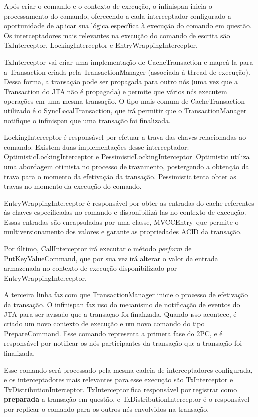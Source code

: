 \documentclass[11pt,twoside,a4paper]{book}
\begin{document}
Após criar o comando e o contexto de execução, o infinispan inicia o processamento do comando, oferecendo a cada interceptador configurado a oportunidade de aplicar sua lógica específica à execução do comando em questão. Os interceptadores mais relevantes na execução do comando de escrita são TxInterceptor, LockingInterceptor e EntryWrappingInterceptor.

TxInterceptor vai criar uma implementação de CacheTransaction e mapeá-la para a Transaction criada pela TransactionManager (associada à thread de execução). Dessa forma, a transação pode ser propagada para outro nós (uma vez que a Transaction do JTA não é propagada) e permite que vários nós executem operações em uma mesma transação. O tipo mais comum de CacheTransaction utilizado é o SyncLocalTransaction, que irá permitir que o TransactionManager notifique o infinispan que uma transação foi finalizada.

LockingInterceptor é responsável por efetuar a trava das chaves relacionadas ao comando. Existem duas implementações desse interceptador: OptimisticLockingInterceptor e PessimisticLockingInterceptor. Optimistic utiliza uma abordagem otimista no processo de travamento, postergando a obtenção da trava para o momento da efetivação da transação. Pessimistic tenta obter as travas no momento da execução do comando.

EntryWrappingInterceptor é responsável por obter as entradas do cache referentes às chaves especificadas no comando e disponibilizá-las no contexto de execução. Essas entradas são encapsuladas por uma classe, MVCCEntry, que permite o multiversionamento dos valores e garante as propriedades ACID da transação.

Por último, CallInterceptor irá executar o método \emph{perform} de PutKeyValueCommand, que por sua vez irá alterar o valor da entrada armazenada no contexto de execução disponibilizado por EntryWrappingInterceptor.

A terceira linha faz com que TransactionManager inicie o processo de efetivação da transação. O infinispan faz uso do mecanismo de notificação de eventos do JTA para ser avisado que a transação foi finalizada. Quando isso acontece, é criado um novo contexto de execução e um novo comando do tipo PrepareCommand. Esse comando representa a primera fase do 2PC, e é responsável por notificar os nós participantes da transação que a transação foi finalizada. 

Esse comando será processado pela mesma cadeia de interceptadores configurada, e os interceptadores mais relevantes para esse execução são TxInterceptor e TxDistributionInterceptor. TxInterceptor fica responsável por registrar como \textbf{preparada} a transação em questão, e TxDistributionInterceptor é o responsável por replicar o comando para os outros nós envolvidos na transação.
\end{document}
